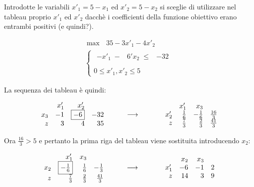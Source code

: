\documentclass[10pt]{article}
\begin{document}
Introdotte le variabili
$x'_1 = 5 - x_1$ ed $x'_2 = 5 - x_2$
si sceglie di utilizzare nel tableau
proprio $x'_1$ ed $x'_2$ dacch\`e
i coefficienti della funzione obiettivo erano
entrambi positivi (e quindi?).

\[
   \begin{array}{l}
        \max \mbox{\ } 35 - 3x'_1 - 4x'_2 \\
        \left\{
        \begin{array}{l}
        \begin{array}{rrrr}
             -x'_1 \;-&  6'x_2 \;\leq & -32 \\
        \end{array} \\
        0 \leq x'_1, x'_2  \leq 5    
        \end{array}
        \right.
   \end{array}
\]

La sequenza dei tableau \`e quindi:

\[
   \begin{array}{rrrr}
         & x'_1  & x'_2 \\
      x_3 & -1  & \fbox{$-6$} &  -32  \\
       z  &  3 &  4  &  35 \\
   \end{array}
\hfill
\hspace{1cm}
{\longrightarrow}
\hfill
\hspace{1.2cm}
   \begin{array}{rrrr}
         & x'_1  & x_3 \\
      x'_2 & \frac{1}{6} & -\frac{1}{6} & \frac{16}{3}  \\
       z   & \frac{7}{3} &  \frac{2}{3} & \frac{41}{3}  \\
   \end{array}
\]

Ora $\frac{16}{3} > 5$ e pertanto la prima riga del
tableau viene sostituita introducendo $x_2$:

\[
   \begin{array}{rrrr}
         & x'_1  & x_3 \\
      x_2  & \fbox{$-\frac{1}{6}$} &  \frac{1}{6} & -\frac{1}{3}  \\
       z   &  \frac{7}{3} &  \frac{2}{3} &  \frac{41}{3}  \\
   \end{array}
\hfill
\hspace{1cm}
{\longrightarrow}
\hfill
\hspace{1.2cm}
   \begin{array}{rrrr}
         & x_2  & x_3 \\
      x'_1 & -6 & -1 & 2  \\
       z   & 14 &  3 & 9  \\
   \end{array}
\]
\end{document}
